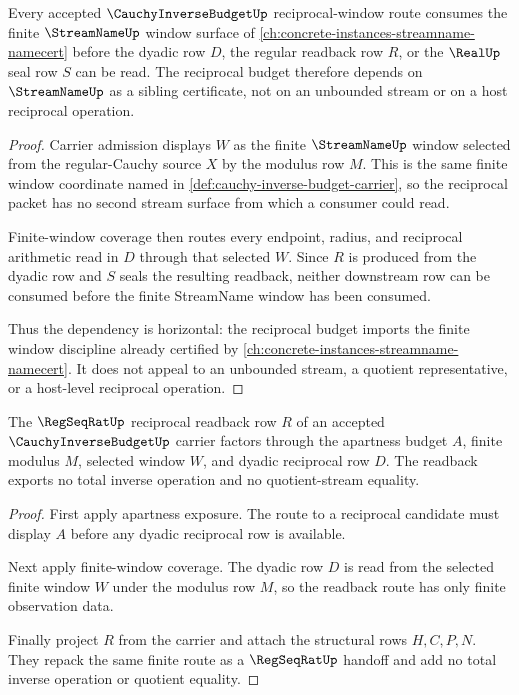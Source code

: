 \begin{theorem}
\label{thm:cauchy-inverse-budget-streamname-window-dependency}
Every accepted $\CauchyInverseBudgetUp$ reciprocal-window route consumes the finite $\StreamNameUp$ window surface of \autoref{ch:concrete-instances-streamname-namecert} before the dyadic row $D$, the regular readback row $R$, or the $\RealUp$ seal row $S$ can be read. The reciprocal budget therefore depends on $\StreamNameUp$ as a sibling certificate, not on an unbounded stream or on a host reciprocal operation.
\end{theorem}
\begin{proof}
Carrier admission displays $W$ as the finite $\StreamNameUp$ window selected from the regular-Cauchy source $X$ by the modulus row $M$. This is the same finite window coordinate named in \autoref{def:cauchy-inverse-budget-carrier}, so the reciprocal packet has no second stream surface from which a consumer could read.

Finite-window coverage then routes every endpoint, radius, and reciprocal arithmetic read in $D$ through that selected $W$. Since $R$ is produced from the dyadic row and $S$ seals the resulting readback, neither downstream row can be consumed before the finite StreamName window has been consumed.

Thus the dependency is horizontal: the reciprocal budget imports the finite window discipline already certified by \autoref{ch:concrete-instances-streamname-namecert}. It does not appeal to an unbounded stream, a quotient representative, or a host-level reciprocal operation.
\end{proof}

\begin{theorem}
\label{thm:cauchy-inverse-budget-reciprocal-readback-route}
The $\RegSeqRatUp$ reciprocal readback row $R$ of an accepted $\CauchyInverseBudgetUp$ carrier factors through the apartness budget $A$, finite modulus $M$, selected window $W$, and dyadic reciprocal row $D$. The readback exports no total inverse operation and no quotient-stream equality.
\end{theorem}
\begin{proof}
First apply apartness exposure. The route to a reciprocal candidate must display $A$ before any dyadic reciprocal row is available.

Next apply finite-window coverage. The dyadic row $D$ is read from the selected finite window $W$ under the modulus row $M$, so the readback route has only finite observation data.

Finally project $R$ from the carrier and attach the structural rows $H,C,P,N$. They repack the same finite route as a $\RegSeqRatUp$ handoff and add no total inverse operation or quotient equality.
\end{proof}

